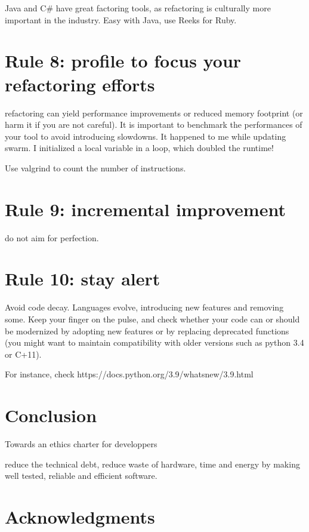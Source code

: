 \documentclass[10pt,letterpaper]{article}
\begin{document}
Java and C\# have great factoring tools, as refactoring is culturally
more important in the industry. Easy with Java, use Reeks for Ruby.

\section*{Rule 8: profile to focus your refactoring efforts}

refactoring can yield performance improvements or reduced memory
footprint (or harm it if you are not careful). It is important to
benchmark the performances of your tool to avoid introducing
slowdowns. It happened to me while updating swarm. I initialized a
local variable in a loop, which doubled the runtime!

Use valgrind to count the number of instructions.

\section*{Rule 9: incremental improvement}

do not aim for perfection.

\section*{Rule 10: stay alert}

Avoid code decay. Languages evolve, introducing new features and
removing some. Keep your finger on the pulse, and check whether your
code can or should be modernized by adopting new features or by
replacing deprecated functions (you might want to maintain
compatibility with older versions such as python 3.4 or C+11).

For instance, check https://docs.python.org/3.9/whatsnew/3.9.html

\section*{Conclusion}


Towards an ethics charter for developpers

reduce the technical debt, reduce waste of hardware, time and energy
by making well tested, reliable and efficient software.

\section*{Acknowledgments}
\end{document}
